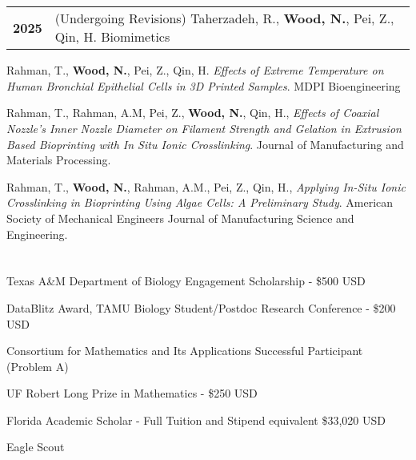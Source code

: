 \documentclass[11pt]{article}
\begin{document}
\section*{\color{secondary}{Other Publications}}
        \begin{tabularx}{\textwidth}{lX}
		\textbf{2025} & {(Undergoing Revisions) Taherzadeh, R.,
		\textbf{Wood, N.}, Pei, Z., Qin, H. \emph{} 
		Biomimetics} \\ 
        \end{tabularx}
        \begin{description}[noitemsep]
                \item [2024] {Rahman, T., \textbf{Wood, N.},
                        Pei, Z., Qin, H. \emph{Effects of Extreme Temperature on
                        Human Bronchial Epithelial Cells in 3D Printed Samples}.
                MDPI Bioengineering} 

                \item [2024] {Rahman, T., Rahman, A.M,
                        Pei, Z., \textbf{Wood, N.}, Qin, H.,
                        \emph{Effects of Coaxial Nozzle's Inner Nozzle Diameter
                on Filament Strength and Gelation in Extrusion Based Bioprinting
                with In Situ Ionic Crosslinking}. Journal of Manufacturing
                and Materials Processing.}
                \item [2023] {Rahman, T., \textbf{Wood, N.}, Rahman, A.M.,
                        Pei, Z., Qin, H., \emph{Applying In-Situ 
                        Ionic Crosslinking in Bioprinting Using
                        Algae Cells: A Preliminary Study}. American Society 
                of Mechanical Engineers Journal of Manufacturing Science
                and Engineering}.
        \end{description}

\section*{\color{secondary}{Awards}}
        \begin{description}[noitemsep]
                \item [2024] {Texas A\&M Department of Biology Engagement Scholarship
                        - \$500 USD}
                \item [2023] {DataBlitz Award, TAMU Biology Student/Postdoc 
        			Research Conference - \$200 USD}
                 \item [2022] {Consortium for Mathematics and Its Applications
        			Successful Participant (Problem A)}
                \item[2022] {UF Robert Long Prize in Mathematics - \$250 USD}
                \item[2017-22] {Florida Academic Scholar - Full Tuition and 
			            Stipend equivalent \$33,020 USD}
                \item[2016] {Eagle Scout}
        \end{description}
\end{document}
